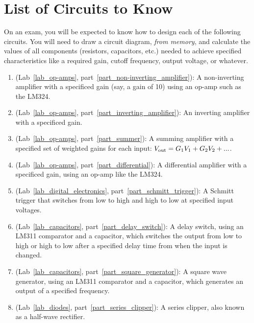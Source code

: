 \section{List of Circuits to Know}
\label{circuits_to_know}

On an exam, you will be expected to know how to design each of the following circuits.  You will need to draw a circuit diagram, \textit{from memory}, and calculate the values of all components (resistors, capacitors, etc.) needed to achieve specified characteristics like a required gain, cutoff frequency, output voltage, or whatever.

\begin{flushleft}
\begin{enumerate}[align=left,leftmargin=*]%

\item (Lab~\ref{lab_op-amps}, part~\ref{part_non-inverting_amplifier}): A non-inverting amplifier with a specificed gain (say, a gain of 10) using an op-amp such as the LM324.

\item (Lab~\ref{lab_op-amps}, part~\ref{part_inverting_amplifier}): An inverting amplifier with a specificed gain.

\item (Lab~\ref{lab_op-amps}, part~\ref{part_summer}): A summing amplifier with a specified set of weighted gains for each input: $V_{\rm out}=G_1V_1 + G_2V_2 + ...$.

\item (Lab~\ref{lab_op-amps}, part~\ref{part_differential}): A differential amplifier with a specificed gain, using an op-amp like the LM324.

\item (Lab~\ref{lab_digital_electronics}, part~\ref{part_schmitt_trigger}): A Schmitt trigger that switches from low to high and high to low at specified input voltages.

\item (Lab~\ref{lab_capacitors}, part~\ref{part_delay_switch}): A delay switch, using an LM311 comparator and a capacitor, which switches the output from low to high or high to low after a specified delay time from when the input is changed.

\item (Lab~\ref{lab_capacitors}, part~\ref{part_square_generator}): A square wave generator, using an LM311 comparator and a capacitor, which generates an output of a specified frequency.

\item (Lab~\ref{lab_diodes}, part~\ref{part_series_clipper}): A series clipper, also known as a half-wave rectifier.


\end{enumerate}
\end{flushleft}
